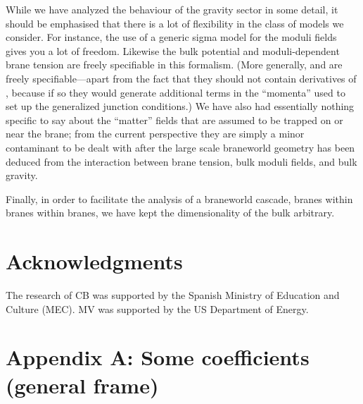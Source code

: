 \documentclass[a4paper,10pt]{article}
\renewcommand{\theequation}{\arabic{section}.\arabic{equation}}
\begin{document}
{While we have analyzed the behaviour of the gravity sector in some
detail, it should be emphasised that there is a lot of flexibility in
the class of models we consider. For instance, the use of a generic
sigma model for the moduli fields gives you a lot of freedom. Likewise
the bulk potential \coordHE{} and moduli-dependent brane tension
\myHighlight{$\lambda(\phi)$}\coordHE{} are freely specifiable in this formalism. (More
generally, \coordHE{} and \coordHE{} are
freely specifiable---apart from the fact that they should not contain
derivatives of \myHighlight{$\phi$}\coordHE{}, because if so they would generate additional
terms in the ``momenta'' used to set up the generalized junction
conditions.) We have also had essentially nothing specific to say
about the ``matter'' fields that are assumed to be trapped on or near
the brane; from the current perspective they are simply a minor
contaminant to be dealt with after the large scale braneworld geometry
has been deduced from the interaction between brane tension, bulk
moduli fields, and bulk gravity.

Finally, in order to facilitate the analysis of a braneworld cascade,
branes within branes within branes, we have kept the dimensionality
of the bulk arbitrary.



\section*{Acknowledgments}
The research of CB was supported by the Spanish Ministry of Education
and Culture (MEC). MV was supported by the US Department of Energy.

\appendix
\section*{Appendix A: Some coefficients (general frame)}
\label{S:coefficents}
\setcounter{equation}{0}
\renewcommand{\theequation}{A.\arabic{equation}}

}
\end{document}
